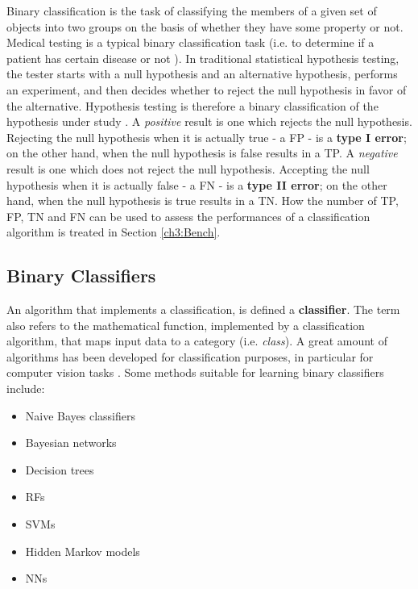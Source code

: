 Binary classification is the task of classifying the members of a given set of objects into two groups on the basis of whether they have some property or not\cite{scholkopf2002learning}.
Medical testing is a typical binary classification task (i.e. to determine if a patient has certain disease or not ).
In traditional statistical hypothesis testing, the tester starts with a null hypothesis and an alternative hypothesis,
performs an experiment, and then decides whether to reject the null hypothesis in favor of the alternative.
Hypothesis testing is therefore a binary classification of the hypothesis under study \cite{mitchML}.
A \textit{positive} result is one which rejects the null hypothesis.
Rejecting the null hypothesis when it is actually true - a \Gls{FP} - is a \textbf{type I error};
on the other hand, when the null hypothesis is false results in a \Gls{TP}.
A \textit{negative} result is one which does not reject the null hypothesis.
Accepting the null hypothesis when it is actually false - a \Gls{FN} - is a \textbf{type II error};
on the other hand, when the null hypothesis is true results in a \Gls{TN}.
How the number of \Gls{TP}, \Gls{FP}, \Gls{TN} and \Gls{FN} can be used to assess the performances of a classification algorithm is treated in Section \ref{ch3:Bench}.


\subsection{Binary Classifiers}

An algorithm that implements a classification, is defined a \textbf{classifier}.
The term also refers to the mathematical function, implemented by a classification algorithm, that maps input data to a category (i.e. \textit{class}).
A great amount of algorithms has been developed for classification purposes, in particular for computer vision tasks \cite{classificationSurvey}.
Some methods suitable for learning binary classifiers include\cite{dataMiningBook}:

\begin{itemize}
 \item Naive Bayes classifiers
 \item Bayesian networks \ \cite{bayesClassifiersCellSegmentation}
 \item Decision trees \ \cite{randTree01}
 \item \Glspl{RF} \ \cite{randForests01}
 \item \Glspl{SVM} \ \cite{SVM01}
 \item Hidden Markov models
 \item \Glspl{NN} \ \cite{russell2010artificial}
\end{itemize}


